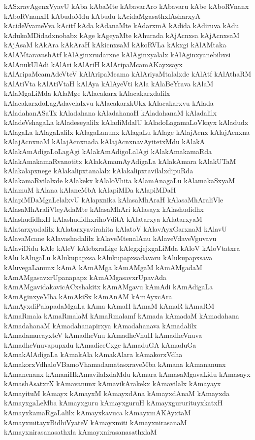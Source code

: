 {kASxravAgenxVyavU
kAba
kAbaMte
kAbavarAro
kAbavaru
kAbe
kAboRVnanx
kAboRVnanxH
kAbudoMdu
kAbudu
kAcidaMgasathxlAsharxyA
kAcideVvameVva
kAcitf
kAda
kAdanaMte
kAdarxmA
kAdida
kAdiruva
kAdu
kAdukoMDidadxnobabx
kAge
kAgeyaMte
kAhurada
kAjAcnxsa
kAjAcnxsaM
kAjAsaM
kAkAra
kAkAraH
kAkicnxsaM
kAkoRVLa
kAkxgi
kAlAMtaka
kAlAMtaravashAtf
kAlAginxrudarxne
kAlAginxyalalx
kAlAginxyanebibxsi
kAlAnukUlAdi
kAlAri
kAlAriH
kAlAripaMcamAKayxsayx
kAlAripaMcamAdeVteV
kAlAripaMcama
kAlAriyaMtalalxde
kAlAtf
kAlAthaRM
kAlAtiVta
kAlAtiVtaH
kAlAya
kAlAyeVti
kAla
kAlaBeYrava
kAlaM
kAlaMgaLiMda
kAlaMge
kAlacakarx
kAlacakarxdalilx
kAlacakarxdoLagAdavelalxvu
kAlacakarxkUkx
kAlacakarxvu
kAlada
kAladahanASaTx
kAladahana
kAladahanaH
kAladahanaM
kAladalilx
kAladeVshagaLa
kAladeseyalilx
kAladiMdalU
kAladoLagamaLoVkayx
kAladudx
kAlagaLa
kAlagaLalilx
kAlagaLanunx
kAlagaLu
kAlage
kAlajAcnx
kAlajAcnxna
kAlajAcnxnaM
kAlajAcnxnada
kAlajAcnxnavAyitetxMdu
kAlakA
kAlakAmAdigaLoLagAgi
kAlakAmAdigoLalAgi
kAlakAmakamaRda
kAlakAmakamaRvanotitx
kAlakAmamAyAdigaLa
kAlakAmara
kAlakUTaM
kAlakalapxnege
kAlakalipxtanalalx
kAlakalipxtavilalxdipuRda
kAlakamaRvilalxde
kAlakekx
kAlaloVhita
kAlamAnagaLu
kAlamakaSxyaM
kAlamuM
kAlana
kAlaneMbA
kAlapiMDa
kAlapiMDaH
kAlapiMDaMgaLelalxvU
kAlapxnika
kAlasaMhAraH
kAlasaMhAraliVle
kAlasaMhAraliVleyAdaMte
kAlasaMhAri
kAlasayx
kAlashudidhx
kAlashudidhxH
kAlashudidhxrihoVditA
kAlatarxya
kAlatarxyaM
kAlatarxyadalilx
kAlatarxyavirahita
kAlatoV
kAlavAyxGarxnaM
kAlavU
kAlavaMcane
kAlavashadalilx
kAlaveMtenalAnu
kAlaveVdaveVguvavu
kAlaviDidu
kAle
kAleV
kAlebxraLige
kAlegxjejxgaLiMda
kAloV
kAloVtatxra
kAlu
kAlugaLu
kAlukupapxsa
kAlukupapxsadavaru
kAlukupapxsava
kAluvegaLanunx
kAmA
kAmAMga
kAmAMgaM
kAmAMgadaM
kAmAMgasavxrUpanapapx
kAmAMgasavxrUpavAda
kAmAMgavidakavicACxshakitx
kAmAMgavu
kAmAdi
kAmAdigaLa
kAmAginxyeMba
kAmAkiSx
kAmAnAM
kAmAyxcAra
kAmAyxdiPalapadaMgaLa
kAma
kAmaH
kAmaM
kAmaR
kAmaRM
kAmaRmala
kAmaRmalaM
kAmaRmalamf
kAmada
kAmadaM
kAmadahana
kAmadahanaM
kAmadahanapirxya
kAmadahanava
kAmadalilx
kAmadamucayxteV
kAmadheVnu
kAmadheVnuH
kAmadheVnuva
kAmadheVnuvapupxdu
kAmadiceCxge
kAmaduGA
kAmaduGa
kAmakAlAdigaLa
kAmakAla
kAmakAlara
kAmakorxVdha
kAmakorxVdhaloVBamoVhamadamatasxraveMba
kAmana
kAmananunx
kAmanenanx
kAmaniHkAmavilalxdaMdu
kAmara
kAmasaMgavaLidu
kAmasayx
kAmashAsatxrX
kAmavanunx
kAmavikArakekx
kAmavilalx
kAmayayx
kAmayituM
kAmayx
kAmayxM
kAmayxdAna
kAmayxdAnaM
kAmayxda
kAmayxgaLeMba
kAmayxguru
kAmayxguruH
kAmayxgururituyxkatxH
kAmayxkamaRgaLalilx
kAmayxkavuca
kAmayxmAKAyxtaM
kAmayxmitayxBidhiVyateV
kAmayxmiti
kAmayxnirasanaM
kAmayxnirasanasathxla
kAmayxnirasanasathxlaM
}
